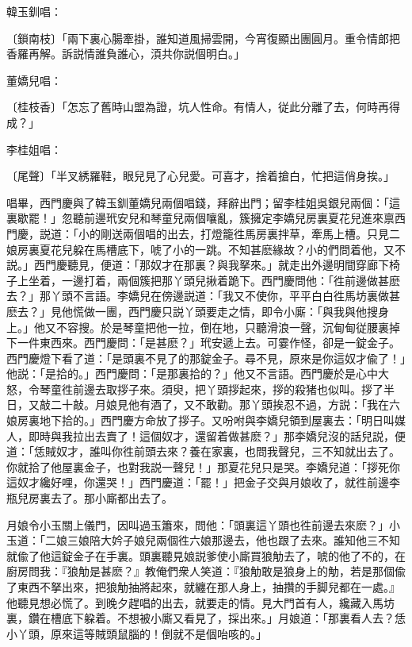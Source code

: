 韓玉釧唱：

\begin{myquote}
{\markfont〔鎖南枝〕}「兩下裏心腸牽掛，誰知道風掃雲開，今宵復顯出團圓月。重令情郎把香羅再解。訴説情誰負誰心，湏共你説個明白。」
\end{myquote}

董嬌兒唱：

\begin{myquote}
{\markfont〔桂枝香〕}「怎忘了舊時山盟為證，坑人性命。有情人，従此分離了去，何時再得成？」
\end{myquote}

李桂姐唱：

\begin{myquote}
{\markfont〔尾聲〕}「半叉綉羅鞋，眼兒見了心兒愛。可喜才，捨着搶白，忙把這俏身挨。」
\end{myquote}

唱畢，西門慶與了韓玉釧董嬌兒兩個唱錢，拜辭出門；留李桂姐吳銀兒兩個：「這裏歇罷！」忽聽前邊玳安兒和琴童兒兩個嚷亂，簇擁定李嬌兒房裏夏花兒進來禀西門慶，説道：「小的剛送兩個唱的出去，打燈籠徃馬房裏拌草，牽馬上槽。只見二娘房裏夏花兒躱在馬槽底下，唬了小的一跳。不知甚麽緣故？小的們問着他，又不説。」西門慶聽見，便道：「那奴才在那裏？與我拏來。」就走出外邊明間穿廊下椅子上坐着，一邊打着，兩個簇把那丫頭兒揪着跪下。西門慶問他：「徃前邊做甚麽去？」那丫頭不言語。李嬌兒在傍邊説道：「我又不使你，平平白白徃馬坊裏做甚麽去？」見他慌做一團，西門慶只説丫頭要走之情，即令小廝：「與我與他搜身上。」他又不容搜。於是琴童把他一拉，倒在地，只聽滑浪一聲，沉甸甸従腰裏掉下一件東西來。西門慶問：「是甚麽？」玳安遞上去。可霎作怪，卻是一錠金子。西門慶燈下看了道：「是頭裏不見了的那錠金子。尋不見，原來是你這奴才偸了！」他説：「是拾的。」西門慶問：「是那裏拾的？」他又不言語。西門慶於是心中大怒，令琴童徃前邊去取拶子來。須臾，把丫頭拶起來，拶的殺猪也似叫。拶了半日，又敲二十敲。月娘見他有酒了，又不敢勸。那丫頭挨忍不過，方説：「我在六娘房裏地下拾的。」西門慶方命放了拶子。又吩咐與李嬌兒領到屋裏去：「明日叫媒人，即時與我拉出去賣了！這個奴才，還留着做甚麽？」那李嬌兒沒的話兒説，便道：「恁賊奴才，誰叫你徃前頭去來？養在家裏，也問我聲兒，三不知就出去了。你就拾了他屋裏金子，也對我説一聲兒！」那夏花兒只是哭。李嬌兒道：「拶死你這奴才纔好哩，你還哭！」西門慶道：「罷！」把金子交與月娘收了，就徃前邊李瓶兒房裏去了。那小廝都出去了。

月娘令小玉關上儀門，因叫過玉簫來，問他：「頭裏這丫頭也徃前邊去來麽？」小玉道：「二娘三娘陪大妗子娘兒兩個徃六娘那邊去，他也跟了去來。誰知他三不知就偸了他這錠金子在手裏。頭裏聽見娘説爹使小廝買狼觔去了，唬的他了不的，在廚房問我：『狼觔是甚麽？』教俺們衆人笑道：『狼觔敢是狼身上的觔，若是那個偸了東西不拏出來，把狼觔抽將起來，就纏在那人身上，抽攢的手脚兒都在一處。』他聽見想必慌了。到晚夕趕唱的出去，就要走的情。見大門首有人，纔藏入馬坊裏，鑽在槽底下躱着。不想被小廝又看見了，採出來。」月娘道：「那裏看人去？恁小丫頭，原來這等賊頭鼠腦的！倒就不是個咍咳的。」

